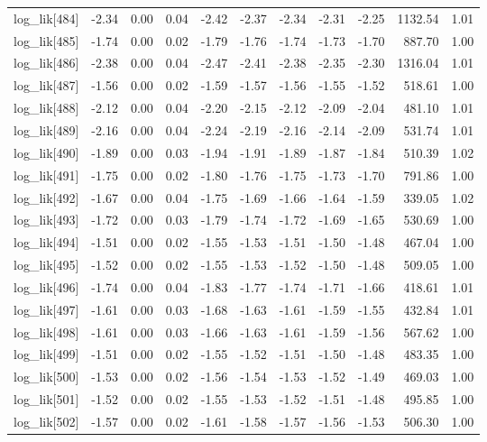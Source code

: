 \begin{table}[ht]
\begin{tabular}{rrrrrrrrrrr}
  log\_lik[484] & -2.34 & 0.00 & 0.04 & -2.42 & -2.37 & -2.34 & -2.31 & -2.25 & 1132.54 & 1.01 \\ 
  log\_lik[485] & -1.74 & 0.00 & 0.02 & -1.79 & -1.76 & -1.74 & -1.73 & -1.70 & 887.70 & 1.00 \\ 
  log\_lik[486] & -2.38 & 0.00 & 0.04 & -2.47 & -2.41 & -2.38 & -2.35 & -2.30 & 1316.04 & 1.01 \\ 
  log\_lik[487] & -1.56 & 0.00 & 0.02 & -1.59 & -1.57 & -1.56 & -1.55 & -1.52 & 518.61 & 1.00 \\ 
  log\_lik[488] & -2.12 & 0.00 & 0.04 & -2.20 & -2.15 & -2.12 & -2.09 & -2.04 & 481.10 & 1.01 \\ 
  log\_lik[489] & -2.16 & 0.00 & 0.04 & -2.24 & -2.19 & -2.16 & -2.14 & -2.09 & 531.74 & 1.01 \\ 
  log\_lik[490] & -1.89 & 0.00 & 0.03 & -1.94 & -1.91 & -1.89 & -1.87 & -1.84 & 510.39 & 1.02 \\ 
  log\_lik[491] & -1.75 & 0.00 & 0.02 & -1.80 & -1.76 & -1.75 & -1.73 & -1.70 & 791.86 & 1.00 \\ 
  log\_lik[492] & -1.67 & 0.00 & 0.04 & -1.75 & -1.69 & -1.66 & -1.64 & -1.59 & 339.05 & 1.02 \\ 
  log\_lik[493] & -1.72 & 0.00 & 0.03 & -1.79 & -1.74 & -1.72 & -1.69 & -1.65 & 530.69 & 1.00 \\ 
  log\_lik[494] & -1.51 & 0.00 & 0.02 & -1.55 & -1.53 & -1.51 & -1.50 & -1.48 & 467.04 & 1.00 \\ 
  log\_lik[495] & -1.52 & 0.00 & 0.02 & -1.55 & -1.53 & -1.52 & -1.50 & -1.48 & 509.05 & 1.00 \\ 
  log\_lik[496] & -1.74 & 0.00 & 0.04 & -1.83 & -1.77 & -1.74 & -1.71 & -1.66 & 418.61 & 1.01 \\ 
  log\_lik[497] & -1.61 & 0.00 & 0.03 & -1.68 & -1.63 & -1.61 & -1.59 & -1.55 & 432.84 & 1.01 \\ 
  log\_lik[498] & -1.61 & 0.00 & 0.03 & -1.66 & -1.63 & -1.61 & -1.59 & -1.56 & 567.62 & 1.00 \\ 
  log\_lik[499] & -1.51 & 0.00 & 0.02 & -1.55 & -1.52 & -1.51 & -1.50 & -1.48 & 483.35 & 1.00 \\ 
  log\_lik[500] & -1.53 & 0.00 & 0.02 & -1.56 & -1.54 & -1.53 & -1.52 & -1.49 & 469.03 & 1.00 \\ 
  log\_lik[501] & -1.52 & 0.00 & 0.02 & -1.55 & -1.53 & -1.52 & -1.51 & -1.48 & 495.85 & 1.00 \\ 
  log\_lik[502] & -1.57 & 0.00 & 0.02 & -1.61 & -1.58 & -1.57 & -1.56 & -1.53 & 506.30 & 1.00 \\ 

\end{tabular}
\end{table}
